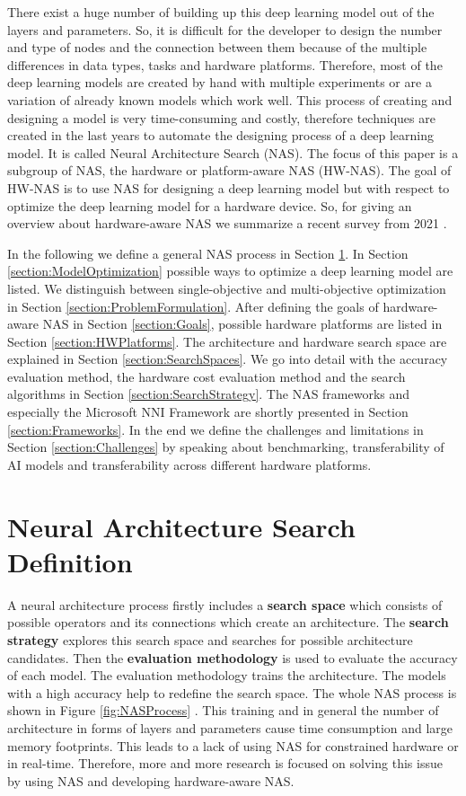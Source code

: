 \documentclass[conference]{IEEEtran}
\begin{document}
There exist a huge number of building up this deep learning model out of the layers and parameters. So, it is difficult for the developer to design the number and type of nodes and the connection between them because of the multiple differences in data types, tasks and hardware platforms. Therefore, most of the deep learning models are created by hand with multiple experiments or are a variation of already known models which work well. This process of creating and designing a model is very time-consuming and costly, therefore techniques are created in the last years to automate the designing process of a deep learning model. It is called Neural Architecture Search (NAS). The focus of this paper is a subgroup of NAS, the hardware or platform-aware NAS (HW-NAS). The goal of HW-NAS is to use NAS for designing a deep learning model but with respect to optimize the deep learning model for a hardware device. So, for giving an overview about hardware-aware NAS we summarize a recent survey from 2021 \cite{bib1}. 

In the following we define a general NAS process in Section \ref{section:NASDefinition}. In Section \ref{section:ModelOptimization} possible ways to optimize a deep learning model are listed. We distinguish between single-objective and multi-objective optimization in Section \ref{section:ProblemFormulation}. After defining the goals of hardware-aware NAS in Section \ref{section:Goals}, possible hardware platforms are listed in Section \ref{section:HWPlatforms}. The architecture and hardware search space are explained in Section \ref{section:SearchSpaces}. We go into detail with the accuracy evaluation method, the hardware cost evaluation method and the search algorithms in Section \ref{section:SearchStrategy}. The NAS frameworks and especially the Microsoft NNI Framework are shortly presented in Section \ref{section:Frameworks}. In the end we define the challenges and limitations in Section \ref{section:Challenges} by speaking about benchmarking, transferability of AI models and transferability across different hardware platforms.  

\section{Neural Architecture Search Definition}
\label{section:NASDefinition}
A neural architecture process firstly includes a \textbf{search space} which consists of possible operators and its connections which create an architecture. The \textbf{search strategy} explores this search space and searches for possible architecture candidates. Then the \textbf{evaluation methodology} is used to evaluate the accuracy of each model. The evaluation methodology trains the architecture. The models with a high accuracy help to redefine the search space. The whole NAS process is shown in Figure \ref{fig:NASProcess} \cite{bib1}. This training and in general the  number of architecture in forms of layers and parameters cause time consumption and large memory footprints. This leads to a lack of using NAS for constrained hardware or in real-time. Therefore, more and more research is focused on solving this issue by using NAS and developing hardware-aware NAS. 
\end{document}
